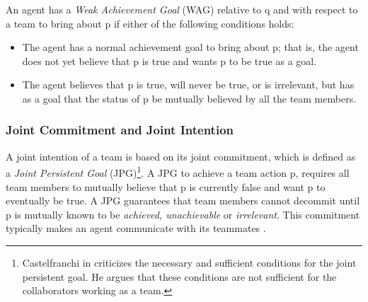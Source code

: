 \documentclass[12pt]{report}
\begin{document}
An agent has a \textit{Weak Achievement Goal} (WAG) relative to q and with
respect to a team to bring about p if either of the following conditions holds:

\begin{itemize}
  \item The agent has a normal achievement goal to bring about p; that is, the
  agent does not yet believe that p is true and wants p to be true as a goal.
  \item The agent believes that p is true, will never be true, or is irrelevant,
  but has as a goal that the status of p be mutually believed by all the team
  members.
\end{itemize}

% 

\subsubsection{Joint Commitment and Joint Intention}
A joint intention of a team is based on its joint commitment, which is defined
as a \textit{Joint Persistent Goal} (JPG)\footnote{Castelfranchi in
\cite{castelfranchi:commitments-aids} criticizes the necessary and sufficient
conditions for the joint persistent goal. He argues that these conditions are
not sufficient for the collaborators working as a team.}. A JPG to achieve a
team action p, requires all team members to mutually believe that p is currently
false and want p to eventually be true. A JPG guarantees that team members
cannot decommit until p is mutually known to be \textit{achieved, unachievable}
or \textit{irrelevant}. This commitment typically makes an agent communicate
with its teammates \cite{cohen:teamwork}.
\end{document}
